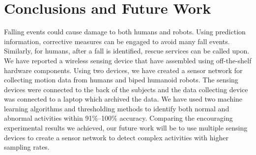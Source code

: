 \documentclass{IEEEtran}
\begin{document}
\section{Conclusions and Future Work}

Falling events could cause damage to both humans and robots.  Using prediction information, 
corrective measures can be engaged to avoid 
 many fall events. Similarly, for humans, after  a fall is identified, rescue services 
 can be called upon. We have reported a wireless sensing device that have assembled using 
off-the-shelf hardware components. Using two devices, we have created a sensor network for 
collecting motion data from humans and biped humanoid robots. The sensing devices were connected to 
the back of the subjects and the data collecting device was connected to a laptop which archived 
the data. We have used two machine learning algorithms and thresholding methods to 
identify both normal and abnormal activities within 91\%--100\% accuracy. Comparing the encouraging 
experimental results we achieved, our future work will be to use multiple sensing devices to create 
a sensor network to detect complex activities with higher sampling rates.  




\end{document}
